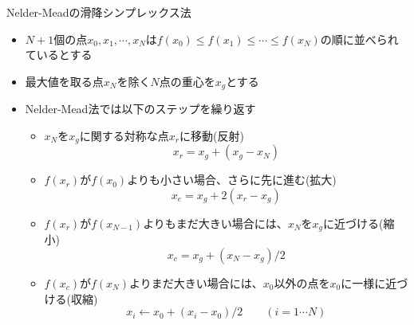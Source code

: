 \begin{frame}[t,fragile]{Nelder-Meadの滑降シンプレックス法}
  \begin{itemize}
  \item $N+1$個の点$x_0,x_1,\cdots,x_N$は$f(x_0) \le f(x_1) \le \cdots \le f(x_N)$の順に並べられているとする
  \item 最大値を取る点$x_N$を除く$N$点の重心を$x_g$とする
  \item Nelder-Mead法では以下のステップを繰り返す
    \begin{itemize}
    \item $x_N$を$x_g$に関する対称な点$x_r$に移動(反射)
      \[
      x_r = x_g + (x_g - x_N)
      \]
    \item $f(x_r)$が$f(x_0)$よりも小さい場合、さらに先に進む(拡大)
      \[
      x_e = x_g + 2(x_r - x_g)
      \]
    \item $f(x_r)$が$f(x_{N-1})$よりもまだ大きい場合には、$x_N$を$x_g$に近づける(縮小)
      \[
      x_c = x_g + (x_N-x_g)/2
      \]
    \item $f(x_c)$が$f(x_N)$よりまだ大きい場合には、$x_0$以外の点を$x_0$に一様に近づける(収縮)
      \[
      x_i \leftarrow x_0 + (x_i-x_0)/2 \qquad (i=1 \cdots N)
      \]
    \end{itemize}
  \end{itemize}
\end{frame}
